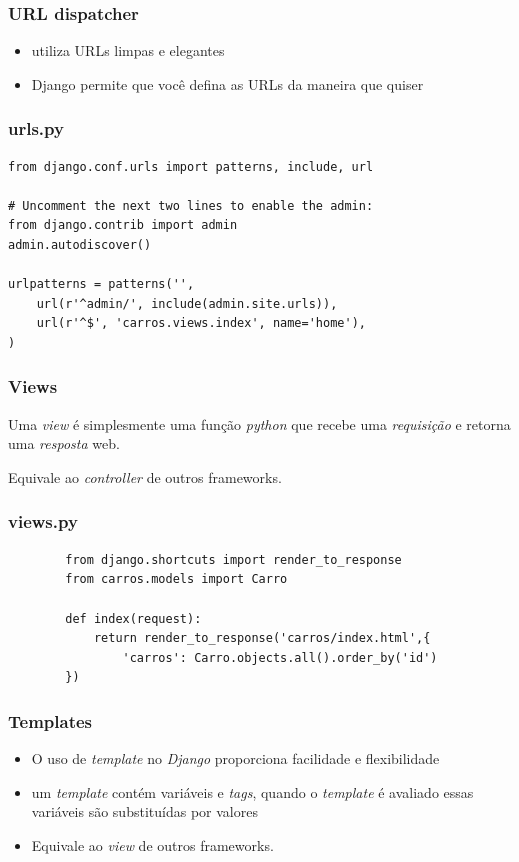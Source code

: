\documentclass[aspectratio=169]{beamer}
\begin{document}
\begin{frame}\frametitle{URL dispatcher}
\begin{itemize}
	\item utiliza URLs limpas e elegantes
	\item Django permite que voc\^e defina as URLs da maneira que quiser
\end{itemize}	
\end{frame}

\begin{frame}[fragile]\frametitle{urls.py}
	\begin{verbatim}
from django.conf.urls import patterns, include, url

# Uncomment the next two lines to enable the admin:
from django.contrib import admin
admin.autodiscover()

urlpatterns = patterns('',
    url(r'^admin/', include(admin.site.urls)),
    url(r'^$', 'carros.views.index', name='home'),
)

	\end{verbatim}
\end{frame}

\begin{frame}\frametitle{Views}
	Uma \emph{view} \'e simplesmente uma fun\c c\~ao \emph{python} que recebe uma \emph{requisi\c c\~ao} e retorna uma \emph{resposta} web.

	Equivale ao \emph{controller} de outros frameworks.
\end{frame}

\begin{frame}[fragile]\frametitle{views.py}
	\begin{verbatim}
		from django.shortcuts import render_to_response
		from carros.models import Carro

		def index(request):
			return render_to_response('carros/index.html',{
				'carros': Carro.objects.all().order_by('id')
		})
	\end{verbatim}
\end{frame}

\begin{frame}\frametitle{Templates}
\begin{itemize}
	\item O uso de \emph{template} no \emph{Django} proporciona facilidade e flexibilidade
	\item um \emph{template} cont\'em vari\'aveis e \emph{tags}, quando o \emph{template} \'e avaliado essas vari\'aveis s\~ao substitu\'idas por valores
	\item Equivale ao \emph{view} de outros frameworks.
\end{itemize}	
\end{frame}
\end{document}

